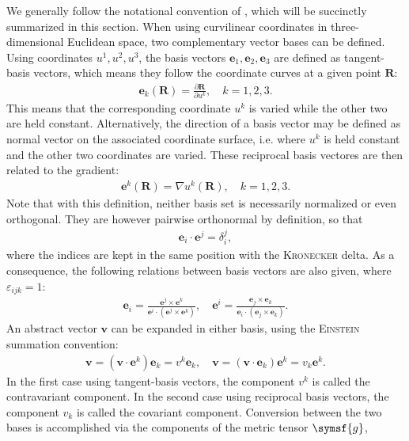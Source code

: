 \documentclass[a4paper, twoside, 10pt, english]{article}
\numberwithin{equation}{section}
\let\vec\symbf
\newcommand*\grad{\ensuremath{\nabla}}
\newcommand*\pd[2][]{\ensuremath{\frac{\partial #1}{\partial #2}}}  %
\begin{document}
We generally follow the notational convention of \textcite{dHaeseleer91}, which will be succinctly summarized in this section. When using curvilinear coordinates in three-dimensional Euclidean space, two complementary vector bases can be defined. Using coordinates $u^{1}, u^{2}, u^{3}$, the basis vectors $\vec{e}_{1}, \vec{e}_{2}, \vec{e}_{3}$ are defined as tangent-basis vectors, which means they follow the coordinate curves at a given point $\vec{R}$:
\begin{gather}
  \vec{e}_{k} (\vec{R}) = \pd[\vec{R}]{u^{k}}, \quad k = 1, 2, 3.
\end{gather}
This means that the corresponding coordinate $u^{k}$ is varied while the other two are held constant. Alternatively, the direction of a basis vector may be defined as normal vector on the associated coordinate surface, i.e. where $u^{k}$ is held constant and the other two coordinates are varied. These reciprocal basis vectores are then related to the gradient:
\begin{gather}
  \vec{e}^{k} (\vec{R}) = \grad u^{k} (\vec{R}), \quad k = 1, 2, 3.
\end{gather}
Note that with this definition, neither basis set is necessarily normalized or even orthogonal. They are however pairwise orthonormal by definition, so that
\begin{gather}
  \vec{e}_{i} \cdot \vec{e}^{j} = \delta_{i}^{j},
\end{gather}
where the indices are kept in the same position with the \textsc{Kronecker} delta. As a consequence, the following relations between basis vectors are also given, where $\varepsilon_{ijk} = 1$:
\begin{gather}
  \vec{e}_{i} = \frac{\vec{e}^{j} \times \vec{e}^{k}}{\vec{e}^{i} \cdot (\vec{e}^{j} \times \vec{e}^{k})}, \quad \vec{e}^{i} = \frac{\vec{e}_{j} \times \vec{e}_{k}}{\vec{e}_{i} \cdot (\vec{e}_{j} \times \vec{e}_{k})}.
\end{gather}
An abstract vector $\vec{v}$ can be expanded in either basis, using the \textsc{Einstein} summation convention:
\begin{gather}
  \vec{v} = (\vec{v} \cdot \vec{e}^{k}) \vec{e}_{k} = v^{k} \vec{e}_{k}, \quad \vec{v} = (\vec{v} \cdot \vec{e}_{k}) \vec{e}^{k} = v_{k} \vec{e}^{k}.
\end{gather}
In the first case using tangent-basis vectors, the component $v^{k}$ is called the contravariant component. In the second case using reciprocal basis vectors, the component $v_{k}$ is called the covariant component. Conversion between the two bases is accomplished via the components of the metric tensor $\symsf{g}$,
\end{document}
